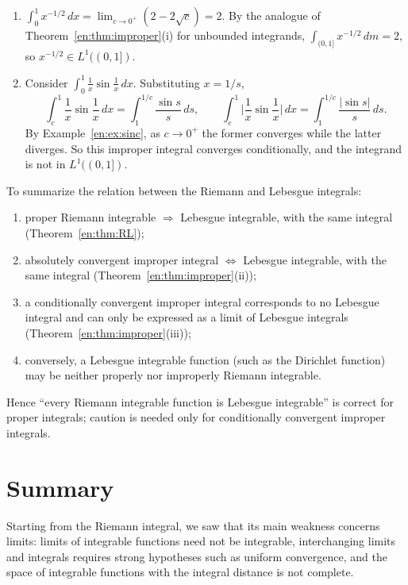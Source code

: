 \documentclass[11pt]{article}
\makeatletter
\newcommand{\envlabel}[1]{\protected@edef\@currentlabel{\themathenv}\label{#1}}
\makeatother
\begin{document}
\begin{example}\envlabel{en:ex:improper2}
\leavevmode
\begin{enumerate}
  \item $\int_{0}^{1}x^{-1/2}\,dx=\lim_{c\to0^{+}}(2-2\sqrt{c})=2$. By the analogue of Theorem~\ref{en:thm:improper}(i) for unbounded integrands, $\int_{(0,1]}x^{-1/2}\,dm=2$, so $x^{-1/2}\in L^{1}((0,1])$.
  \item Consider $\int_{0}^{1}\frac1x\sin\frac1x\,dx$. Substituting $x=1/s$,
  \[
  \int_{c}^{1}\frac1x\sin\frac1x\,dx=\int_{1}^{1/c}\frac{\sin s}{s}\,ds,\qquad\int_{c}^{1}\Big|\frac1x\sin\frac1x\Big|\,dx=\int_{1}^{1/c}\frac{|\sin s|}{s}\,ds.
  \]
  By Example~\ref{en:ex:sinc}, as $c\to0^{+}$ the former converges while the latter diverges. So this improper integral converges conditionally, and the integrand is not in $L^{1}((0,1])$.
\end{enumerate}
\end{example}

\begin{remark}
To summarize the relation between the Riemann and Lebesgue integrals:
\begin{enumerate}
  \item proper Riemann integrable $\Rightarrow$ Lebesgue integrable, with the same integral (Theorem~\ref{en:thm:RL});
  \item absolutely convergent improper integral $\iff$ Lebesgue integrable, with the same integral (Theorem~\ref{en:thm:improper}(ii));
  \item a conditionally convergent improper integral corresponds to no Lebesgue integral and can only be expressed as a limit of Lebesgue integrals (Theorem~\ref{en:thm:improper}(iii));
  \item conversely, a Lebesgue integrable function (such as the Dirichlet function) may be neither properly nor improperly Riemann integrable.
\end{enumerate}
Hence ``every Riemann integrable function is Lebesgue integrable'' is correct for proper integrals; caution is needed only for conditionally convergent improper integrals.
\end{remark}

\section*{Summary}

Starting from the Riemann integral, we saw that its main weakness concerns limits: limits of integrable functions need not be integrable, interchanging limits and integrals requires strong hypotheses such as uniform convergence, and the space of integrable functions with the integral distance is not complete.
\end{document}
